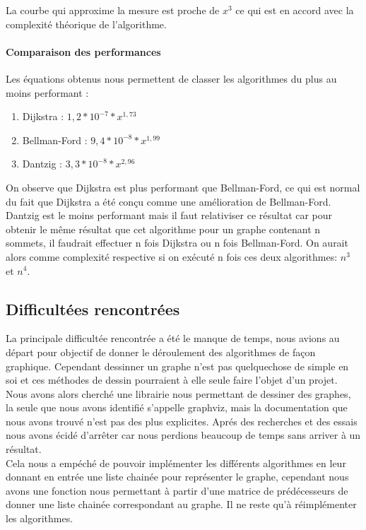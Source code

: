 \documentclass[a4paper,12pt,final] {article}
\begin{document}
La courbe qui approxime la mesure est proche de $x^{3}$ ce qui est en accord avec la complexité théorique de l'algorithme.
\paragraph{Comparaison des performances}
Les équations obtenus nous permettent de classer les algorithmes du plus au moins performant :
\begin{enumerate}
\item Dijkstra :  $1,2*10^{-7}*x^{1,73}$
\item Bellman-Ford :  $9,4*10^{-8}*x^{1,99}$
\item Dantzig : $3,3*10^{-8}*x^{2,96}$
\end{enumerate}
On observe que Dijkstra est plus performant que Bellman-Ford, ce qui est normal du fait que Dijkstra a été con\c cu comme une amélioration de Bellman-Ford.\\

Dantzig est le moins performant mais il faut relativiser ce résultat car pour obtenir le même résultat que cet algorithme pour un graphe contenant n sommets, il faudrait effectuer n fois Dijkstra ou n fois Bellman-Ford. On aurait alors comme complexité respective si on exécuté n fois ces deux algorithmes: $n^{3}$ et $n^{4}$.

\subsection{Difficultées rencontrées}
La principale difficultée rencontrée a été le manque de temps, nous avions au départ pour objectif de donner le déroulement des algorithmes de fa\c con graphique. Cependant dessinner un graphe n'est pas quelquechose de simple en soi et ces méthodes de dessin pourraient à elle seule faire l'objet d'un projet. \\
Nous avons alors cherché une librairie nous permettant de dessiner des graphes, la seule que nous avons identifié s'appelle graphviz, mais la documentation que nous avons trouvé n'est pas des plus explicites. Aprés des recherches et des essais nous avons écidé d'arrêter car nous perdions beaucoup de temps sans arriver à un résultat.\\
Cela nous a empéché de pouvoir implémenter les différents algorithmes en leur donnant en entrée une liste chainée pour représenter le graphe, cependant nous avons une fonction nous permettant à partir d'une matrice de prédécesseurs de donner une liste chainée correspondant au graphe. Il ne reste qu'à réimplémenter les algorithmes.
\end{document}
